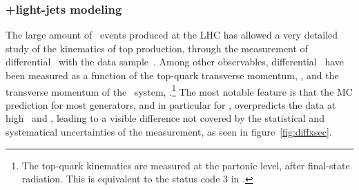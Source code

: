 \subsubsection{\texorpdfstring{\ttbar+light-jets modeling}{tt+light-jets modeling}}
The large amount of \ttbar\ events produced at the LHC has allowed a very detailed study of the kinematics of top production, through the measurement of differential \xsecs\ with the \unit[7]{\tev} data sample~\cite{Aad:2014zka}.
Among other observables,
differential \xsecs\ have been measured as a function of the
top-quark transverse momentum, \toppt, and the transverse
momentum of the \ttbar\ system, \ttbarpt.\footnote{ The top-quark kinematics are measured at the partonic level, after final-state radiation. This is equivalent to the status code 3 in \pythia.}
The most notable feature is that the MC prediction for most generators, and in particular for \PP, overpredicts the
data at high \toppt\ and \ttbarpt,
leading to a visible difference not covered by the statistical and
systematical uncertainties of the measurement, as seen in figure~\ref{fig:diffxsec}.

